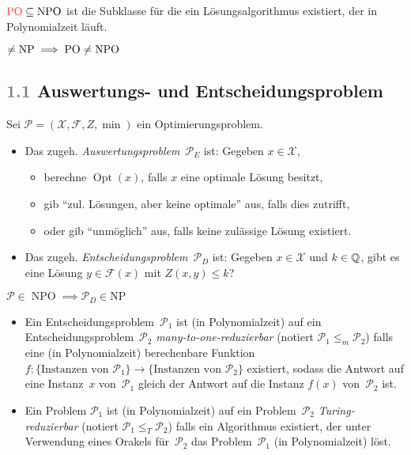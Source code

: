 \documentclass{cheat-sheet}
\newcommand{\Instances}{\mathcal{X}} %
\newcommand{\Feasible}{\mathcal{F}} %
\newcommand{\ObjFun}{Z} %
\newcommand{\MinOptTuple}{(\Instances{}, \Feasible{}, \ObjFun{}, \min)} %
\DeclareMathOperator{\Opt}{Opt} %
\DeclareMathOperator{\NPO}{NPO} %
\DeclareMathOperator{\PO}{PO} %
\DeclareMathOperator{\NP}{NP} %
\let\P\relax %
\DeclareMathOperator{\P}{P} %
\newcommand{\Prob}{\mathcal{P}} %
\newcommand{\ManyOneRed}{\leq_m} %
\newcommand{\TuringRed}{\leq_T} %
\newcommand{\Defn}[1]{\textcolor{DefinitionColor}{#1}}
\newcommand{\scriptSection}[1]{\textcolor{gray}{#1}\enspace}
\begin{document}
\begin{samepage}

\begin{defn}
  $\Defn{\PO} \subseteq \NPO$ ist die Subklasse für die ein Lösungsalgorithmus existiert, der in Polynomialzeit läuft.
\end{defn}

\begin{beob}
  $\P \neq \NP \implies \PO \neq \NPO$
\end{beob}

\subsection{\scriptSection{1.1} Auswertungs- und Entscheidungsproblem}

\begin{defn}
  Sei $\Prob = \MinOptTuple$ ein Optimierungsproblem.
  \begin{itemize}
    \item Das zugeh. \emph{Auswertungsproblem}~$\Prob_E$ ist: Gegeben $x \in \Instances$,
    \begin{itemize}
      \item berechne $\Opt(x)$, falls $x$ eine optimale Lösung besitzt,
      \item gib "`zul. Lösungen, aber keine optimale"' aus, falls dies zutrifft,
      \item oder gib "`unmöglich"' aus, falls keine zulässige Lösung existiert.
    \end{itemize}
    \item Das zugeh. \emph{Entscheidungsproblem}~$\Prob_D$ ist: Gegeben $x \in \Instances$ und $k \in \mathbb{Q}$, gibt es eine Lösung $y \in \Feasible(x)$ mit $Z(x, y) \leq k$?
  \end{itemize}
\end{defn}

\end{samepage}

\begin{lem}
  $\Prob \in \NPO \implies \Prob_D \in \mathrm{NP}$
\end{lem}

\begin{defn}
  \begin{itemize}
    \item Ein Entscheidungsproblem~$\Prob_1$ ist (in Polynomialzeit) auf ein Entscheidungsproblem~$\Prob_2$ \emph{many-to-one-reduzierbar} (notiert $\Prob_1 \ManyOneRed \Prob_2$) falls eine (in Polynomialzeit) berechenbare Funktion $f : \{ \text{Instanzen von~$\Prob_1$} \} \to \{ \text{Instanzen von~$\Prob_2$} \}$ existiert, sodass die Antwort auf eine Instanz~$x$ von~$\Prob_1$ gleich der Antwort auf die Instanz $f(x)$ von~$\Prob_2$ ist.
    \item Ein Problem $\Prob_1$ ist (in Polynomialzeit) auf ein Problem~$\Prob_2$ \emph{Turing-reduzierbar} (notiert $\Prob_1 \TuringRed \Prob_2$) falls ein Algorithmus existiert, der unter Verwendung eines Orakels für~$\Prob_2$ das Problem~$\Prob_1$ (in Polynomialzeit) löst.
  \end{itemize}
\end{defn}
\end{document}

